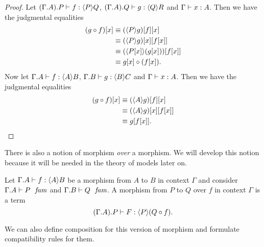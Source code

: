 \begin{proof}
Let $\jhom{{\Gamma}{A}}{P}{Q}{f}$, $\jhom{{\Gamma}{A}}{Q}{R}{g}$ and $\jterm{\Gamma}{A}{x}$.
Then we have the judgmental equalities
\begin{align*}
\subst{x}{\jcomp{f}{g}}
& \jdeq \subst{x}{{f}{\ctxwk{P}{g}}}\\
& \jdeq \subst{{x}{f}}{{x}{\ctxwk{P}{g}}}\\
& \jdeq \subst{{x}{f}}{\ctxwk{\subst{x}{P}}{\subst{x}{g}}}\\
& \jdeq \jcomp{\subst{x}{f}}{\subst{x}{g}}.
\end{align*}
Now let $\jhom{\Gamma}{A}{B}{f}$, $\jhom{\Gamma}{B}{C}{g}$ and $\jterm{\Gamma}{A}{x}$.
Then we have the judgmental equalities
\begin{align*}
\subst{x}{\jcomp{f}{g}}
& \jdeq \subst{x}{{f}{\ctxwk{A}{g}}}\\
& \jdeq \subst{{x}{f}}{{x}{\ctxwk{A}{g}}}\\
& \jdeq \subst{{x}{f}}{g}.
\end{align*}
\end{proof}

There is also a notion of morphism \emph{over} a morphism. We will develop this
notion because it will be needed in the theory of models later on.

\begin{defn}
Let $\jhom{\Gamma}{A}{B}{f}$ be a morphism from $A$ to $B$ in context $\Gamma$
and consider $\jfam{{\Gamma}{A}}{P}$ and $\jfam{{\Gamma}{B}}{Q}$. A morphism
from $P$ to $Q$ over $f$ in context $\Gamma$ is a term
\begin{equation*}
\jfhom{\Gamma}{A}{B}{f}{P}{Q}{F}.
\end{equation*}
\end{defn}

We can also define composition for this version of morphism and formulate
compatibility rules for them. 

